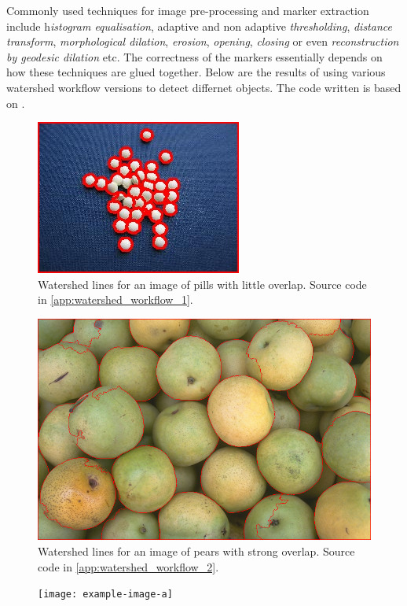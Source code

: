 \documentclass[a4paper]{article}
\begin{document}
Commonly used techniques for image pre-processing and marker extraction include h\textit{istogram equalisation}, adaptive and non adaptive \textit{thresholding}, \textit{distance transform}, \textit{morphological dilation}, \textit{erosion}, \textit{opening}, \textit{closing} or even \textit{reconstruction by geodesic dilation} etc. The correctness of the markers essentially depends on how these techniques are glued together. Below are the results of using various watershed workflow versions to detect differnet objects. The code written is based on  .
\begin{multicols}{3}

\begin{figure}[H]
    \centering
    \includegraphics[width=.3\textwidth]{img/watershed/src_results/watershed_dt_final.jpg}
    \caption{Watershed lines for an image of pills with little overlap. Source code in \ref{app:watershed_workflow_1}.}
\end{figure}
\columnbreak

\begin{figure}[H]
    \centering
    \includegraphics[width=.3\textwidth]{img/watershed/src_results/watershed_morph_final.png}
    \caption{Watershed lines for an image of pears with strong overlap.  Source code in \ref{app:watershed_workflow_2}.}
\end{figure}

\columnbreak

\begin{figure}[H]
    \centering
    \texttt{[image: example-image-a]}
    \caption{}
\end{figure}

\end{multicols}
\end{document}
